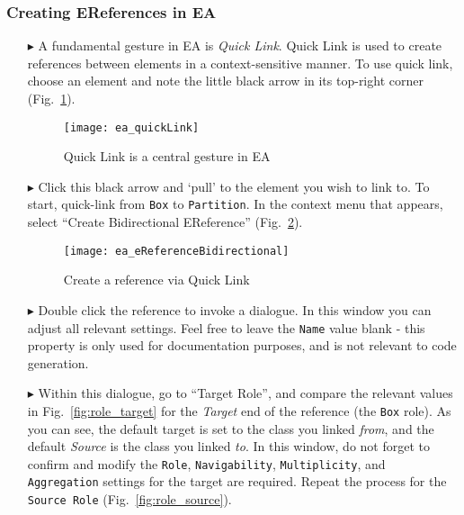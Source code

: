 \newpage
\subsubsection{Creating EReferences in EA}
\visHeader
\hypertarget{static:references vis}{}

\begin{itemize}

\item[$\blacktriangleright$] A fundamental gesture in EA is \emph{Quick Link}. Quick Link is used to create references between elements in a context-sensitive
manner. To use quick link, choose an element and note the little black arrow in its top-right corner (Fig.~\ref{fig:quicklink}).

\begin{figure}[htbp]
	\centering
  \texttt{[image: ea\_quickLink]}
	\caption{Quick Link is a central gesture in EA}
	\label{fig:quicklink}
\end{figure}
\FloatBarrier

\item[$\blacktriangleright$] Click this black arrow and `pull' to the element you wish to link to. To start, quick-link from \texttt{Box} to \texttt{Partition}.
In the context menu that appears, select ``Create Bidirectional EReference'' (Fig.~\ref{fig:ereference}).

\begin{figure}[htbp]
	\centering
  \texttt{[image: ea\_eReferenceBidirectional]}
	\caption{Create a reference via Quick Link}
	\label{fig:ereference}
\end{figure}
\FloatBarrier

\item[$\blacktriangleright$] Double click the reference to invoke a dialogue. In this window you can adjust all relevant settings. Feel free to leave the
\texttt{Name} value blank - this property is only used for documentation purposes, and is not relevant to code generation.

\item[$\blacktriangleright$] Within this dialogue, go to ``Target Role'', and compare the relevant values in Fig.~\ref{fig:role_target} for the \emph{Target}
end of the reference (the \texttt{Box} role). As you can see, the default target is set to the class you linked \emph{from}, and the default \emph{Source} is
the class you linked \emph{to}. In this window, do not forget to confirm and modify the \texttt{Role}, \texttt{Navigability},
\texttt{Multiplicity}, and \texttt{Aggregation} settings for the target are required.  Repeat the process for the \texttt{Source Role}
(Fig.~\ref{fig:role_source}).


\end{itemize}
